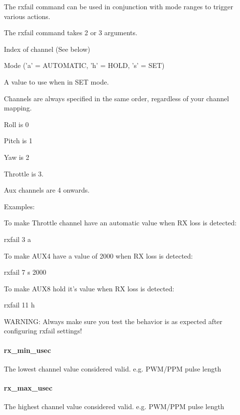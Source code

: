 The rxfail command can be used in conjunction with mode ranges to trigger various actions.

The {\ttfamily rxfail} command takes 2 or 3 arguments.
\begin{DoxyItemize}
\item Index of channel (See below)
\item Mode ('a' = A\+U\+T\+O\+M\+A\+T\+I\+C, 'h' = H\+O\+L\+D, 's' = S\+E\+T)
\item A value to use when in S\+E\+T mode.
\end{DoxyItemize}

Channels are always specified in the same order, regardless of your channel mapping.


\begin{DoxyItemize}
\item Roll is 0
\item Pitch is 1
\item Yaw is 2
\item Throttle is 3.
\item Aux channels are 4 onwards.
\end{DoxyItemize}

Examples\+:

To make Throttle channel have an automatic value when R\+X loss is detected\+:

{\ttfamily rxfail 3 a}

To make A\+U\+X4 have a value of 2000 when R\+X loss is detected\+:

{\ttfamily rxfail 7 s 2000}

To make A\+U\+X8 hold it's value when R\+X loss is detected\+:

{\ttfamily rxfail 11 h}

W\+A\+R\+N\+I\+N\+G\+: Always make sure you test the behavior is as expected after configuring rxfail settings!

\paragraph*{{\ttfamily rx\+\_\+min\+\_\+usec}}

The lowest channel value considered valid. e.\+g. P\+W\+M/\+P\+P\+M pulse length

\paragraph*{{\ttfamily rx\+\_\+max\+\_\+usec}}

The highest channel value considered valid. e.\+g. P\+W\+M/\+P\+P\+M pulse length

